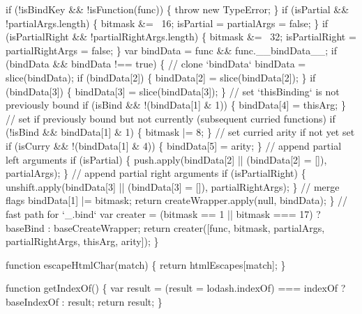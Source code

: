 \begin{DoxyCodeInclude}
      \textcolor{keywordflow}{if} (!isBindKey && !isFunction(func)) \{
        \textcolor{keywordflow}{throw} \textcolor{keyword}{new} TypeError;
      \}
      \textcolor{keywordflow}{if} (isPartial && !partialArgs.length) \{
        bitmask &= ~16;
        isPartial = partialArgs = \textcolor{keyword}{false};
      \}
      \textcolor{keywordflow}{if} (isPartialRight && !partialRightArgs.length) \{
        bitmask &= ~32;
        isPartialRight = partialRightArgs = \textcolor{keyword}{false};
      \}
      var bindData = func && func.\_\_bindData\_\_;
      \textcolor{keywordflow}{if} (bindData && bindData !== \textcolor{keyword}{true}) \{
        \textcolor{comment}{// clone `bindData`}
        bindData = slice(bindData);
        \textcolor{keywordflow}{if} (bindData[2]) \{
          bindData[2] = slice(bindData[2]);
        \}
        \textcolor{keywordflow}{if} (bindData[3]) \{
          bindData[3] = slice(bindData[3]);
        \}
        \textcolor{comment}{// set `thisBinding` is not previously bound}
        \textcolor{keywordflow}{if} (isBind && !(bindData[1] & 1)) \{
          bindData[4] = thisArg;
        \}
        \textcolor{comment}{// set if previously bound but not currently (subsequent curried functions)}
        \textcolor{keywordflow}{if} (!isBind && bindData[1] & 1) \{
          bitmask |= 8;
        \}
        \textcolor{comment}{// set curried arity if not yet set}
        \textcolor{keywordflow}{if} (isCurry && !(bindData[1] & 4)) \{
          bindData[5] = arity;
        \}
        \textcolor{comment}{// append partial left arguments}
        \textcolor{keywordflow}{if} (isPartial) \{
          push.apply(bindData[2] || (bindData[2] = []), partialArgs);
        \}
        \textcolor{comment}{// append partial right arguments}
        \textcolor{keywordflow}{if} (isPartialRight) \{
          unshift.apply(bindData[3] || (bindData[3] = []), partialRightArgs);
        \}
        \textcolor{comment}{// merge flags}
        bindData[1] |= bitmask;
        \textcolor{keywordflow}{return} createWrapper.apply(null, bindData);
      \}
      \textcolor{comment}{// fast path for `\_.bind`}
      var creater = (bitmask == 1 || bitmask === 17) ? baseBind : baseCreateWrapper;
      \textcolor{keywordflow}{return} creater([func, bitmask, partialArgs, partialRightArgs, thisArg, arity]);
    \}

    \textcolor{keyword}{function} escapeHtmlChar(match) \{
      \textcolor{keywordflow}{return} htmlEscapes[match];
    \}

    \textcolor{keyword}{function} getIndexOf() \{
      var result = (result = lodash.indexOf) === indexOf ? baseIndexOf : result;
      \textcolor{keywordflow}{return} result;
    \}


\end{DoxyCodeInclude}
